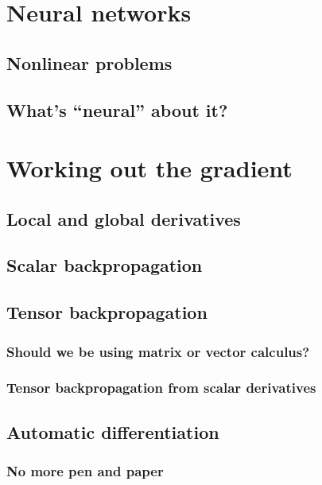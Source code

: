 \documentclass{pca}
\theoremstyle{theorem}
\theoremstyle{definition}
\theoremstyle{proof}
\begin{document}
\section{Neural networks}

\subsection{Nonlinear problems}

\subsection{What's ``neural'' about it? }

\section{Working out the gradient}

\subsection{Local and global derivatives}

\subsection{Scalar backpropagation}

\subsection{Tensor backpropagation}

\subsubsection{Should we be using matrix or vector calculus?}

\subsubsection{Tensor backpropagation from scalar derivatives}

\subsection{Automatic differentiation}

\subsubsection{No more pen and paper}
\end{document}
